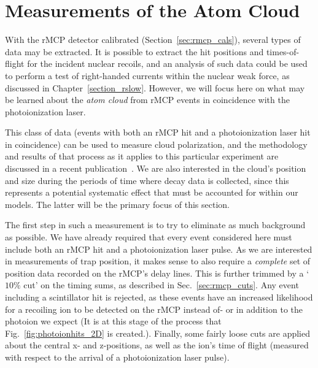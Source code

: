 \FloatBarrier
\section{Measurements of the Atom Cloud}
\label{sec:cloud_calibration}
With the rMCP detector calibrated (Section~\ref{sec:rmcp_cals}), several types of data may be extracted.  It is possible to extract the hit positions and times-of-flight for the incident nuclear recoils, and an analysis of such data could be used to perform a test of right-handed currents within the nuclear weak force, as discussed in Chapter~\ref{section_rslow}.  However, we will focus here on what may be learned about the \emph{atom cloud} from rMCP events in coincidence with the photoionization laser.~  

This class of data (events with both an rMCP hit and a photoionization laser hit in coincidence) can be used to measure cloud polarization, and the methodology and results of that process as it applies to this particular experiment are discussed in a recent publication~\cite{ben_OP}.  We are also interested in the cloud's position and size during the periods of time where decay data is collected, since this represents a potential systematic effect that must be accounted for within our models.  The latter will be the primary focus of this section.  

The first step in such a measurement is to try to eliminate as much background as possible.  We have already required that every event considered here must include both an rMCP hit and a photoionization laser pulse.  As we are interested in measurements of trap position, it makes sense to also require a \emph{complete} set of position data recorded on the rMCP's delay lines.   This is further trimmed by a `$10\%$ cut' on the timing sums, as described in Sec.~\ref{sec:rmcp_cuts}.  Any event including a scintillator hit is rejected, as these events have an increased likelihood for a recoiling ion to be detected on the rMCP instead of- or in addition to the photoion we expect (It is at this stage of the process that Fig.~\ref{fig:photoionhits_2D} is created.).  Finally, some fairly loose cuts are applied about the central x- and z-positions, as well as the ion's time of flight (measured with respect to the arrival of a photoionization laser pulse).

